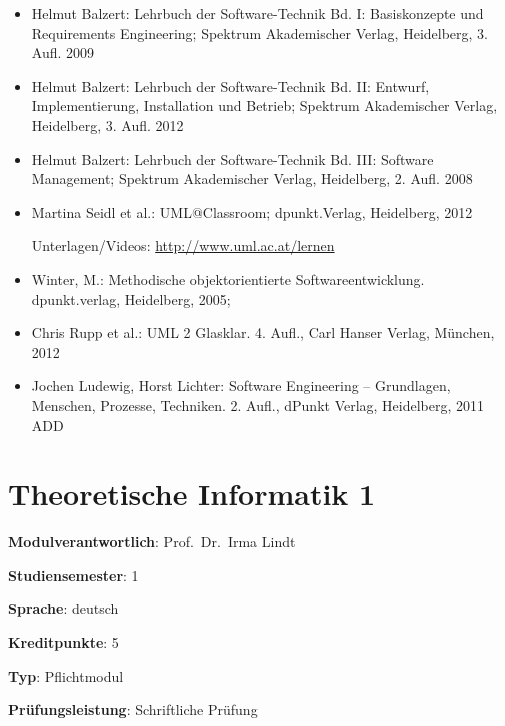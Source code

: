\begin{itemize}
\tightlist
\item
  Helmut Balzert: Lehrbuch der Software-Technik Bd. I: Basiskonzepte und
  Requirements Engineering; Spektrum Akademischer Verlag, Heidelberg, 3.
  Aufl. 2009
\item
  Helmut Balzert: Lehrbuch der Software-Technik Bd. II: Entwurf,
  Implementierung, Installation und Betrieb; Spektrum Akademischer
  Verlag, Heidelberg, 3. Aufl. 2012
\item
  Helmut Balzert: Lehrbuch der Software-Technik Bd. III: Software
  Management; Spektrum Akademischer Verlag, Heidelberg, 2. Aufl. 2008
\item
  Martina Seidl et al.: UML@Classroom; dpunkt.Verlag, Heidelberg, 2012

  Unterlagen/Videos: \url{http://www.uml.ac.at/lernen}
\item
  Winter, M.: Methodische objektorientierte Softwareentwicklung.
  dpunkt.verlag, Heidelberg, 2005;
\item
  Chris Rupp et al.: UML 2 Glasklar. 4. Aufl., Carl Hanser Verlag,
  München, 2012
\item
  Jochen Ludewig, Horst Lichter: Software Engineering -- Grundlagen,
  Menschen, Prozesse, Techniken. 2. Aufl., dPunkt Verlag, Heidelberg,
  2011 ADD
\end{itemize}

\hypertarget{theoretische-informatik-1pathlabelmi-2017modulbeschreibungen-bachelorba_theoretischeinformatik1}{%
\chapter{Theoretische Informatik
1\label{/mi-2017/modulbeschreibungen-bachelor/BA_TheoretischeInformatik1}}\label{theoretische-informatik-1pathlabelmi-2017modulbeschreibungen-bachelorba_theoretischeinformatik1}}

\begin{modulHead}
\textbf{Modulverantwortlich}: Prof.~Dr.~Irma
Lindt
\end{modulHead}
\begin{modulHead}
\textbf{Studiensemester}:
1
\end{modulHead}
\begin{modulHead}
\textbf{Sprache}:
deutsch
\end{modulHead}
\begin{modulHead}
\textbf{Kreditpunkte}:
5
\end{modulHead}
\begin{modulHead}
\textbf{Typ}:
Pflichtmodul
\end{modulHead}
\begin{modulHead}
\textbf{Prüfungsleistung}:
Schriftliche Prüfung
\end{modulHead}


